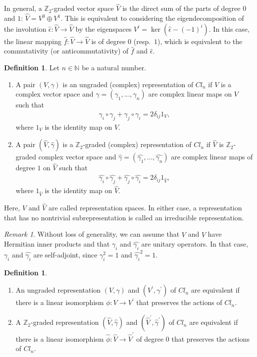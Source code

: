 \documentclass{amsart}
\theoremstyle{definition}
\newtheorem{dfn}[thm]{Definition}
\theoremstyle{remark}
\newtheorem{rem}[thm]{Remark}
\begin{document}
In general, a $\mathbb{Z}_2$-graded vector space $\hat{V}$ is the direct sum of the parts of degree $0$ and $1$: $\hat{V}=V^0 \oplus V^1$.
This is equivalent to considering the eigendecomposition of the involution $\hat{\epsilon} \colon \hat{V} \to \hat{V}$ by the eigenspaces 
$V^i=\ker(\hat{\epsilon}-(-1)^i)$. In this case, the linear mapping $\hat{f} \colon \hat{V} \to \hat{V}$ is of degree $0$ (resp.\ $1$), which is equivalent to the commutativity (or anticommutativity) of $\hat{f}$ and $\hat{\epsilon}$. 


\begin{dfn}
Let $n \in \mathbb{N}$ be a natural number.
\begin{enumerate}
\item A pair $(V,\gamma)$ is an ungraded (complex) representation of $Cl_{n}$ if $V$ is a complex vector space and $\gamma=(\gamma_1,...,\gamma_n)$ are complex linear maps on $V$ such that 
\begin{align*}
\gamma_i \circ \gamma_j+\gamma_j \circ \gamma_i=2\delta_{ij}1_V,
\end{align*}
where $1_V$ is the identity map on $V$.
\item A pair $(\hat{V}, \hat{\gamma})$ is a $\mathbb{Z}_{2}$-graded (complex) representation of $Cl_n$ if $\hat{V}$ is $\mathbb{Z}_2$-graded complex vector space and 
$\hat{\gamma}=(\hat{\gamma_1},...,\hat{\gamma_n})$ are complex linear maps of degree $1$ on $\hat{V}$ such that 
\begin{align*}
\hat{\gamma_i} \circ \hat{\gamma_j}+\hat{\gamma_j} \circ \hat{\gamma_i}=2\delta_{ij}1_{\hat{V}},
\end{align*}
where $1_{\hat{V}}$ is the identity map on $\hat{V}$.
\end{enumerate}
Here, $V$ and $\hat{V}$ are called representation spaces. In either case, a representation that has no nontrivial subrepresentation is called an irreducible representation.
\end{dfn}


\begin{rem}
Without loss of generality, we can assume that $V$ and $\hat{V}$ have Hermitian inner products and that $\gamma_i$ and $\hat{\gamma_i}$ are unitary operators. 
In that case, $\gamma_i$ and $\hat{\gamma_i}$ are self-adjoint, since $\gamma_i^2=1$ and $\hat{\gamma_i}^2=1$.
\end{rem}


\begin{dfn}
\begin{enumerate}
\item
An ungraded representation $(V, \gamma)$ and $(V^{\prime}, \gamma^{\prime})$ of $Cl_n$ are equivalent if there is a linear isomorphism 
$\phi \colon V\to V^{\prime}$ that preserves the actions of $Cl_{n}$.
\item
A $\mathbb{Z}_2$-graded representation $(\hat{V}, \hat{\gamma})$ and $(\hat{V}^{\prime}, \hat{\gamma}^{\prime})$ of $Cl_n$ are equivalent if there is a linear isomorphism $\hat{\phi} \colon \hat{V}\to \hat{V}^{\prime}$  of degree 0 that preserves the actions of $Cl_{n}$.
\end{enumerate}
\end{dfn}
\end{document}
